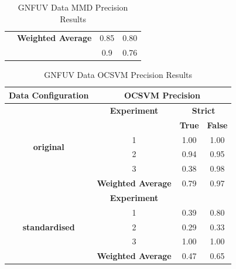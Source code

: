 \documentclass{mpaper}
\begin{document}
\begin{table}[]
\begin{tabular}{|c|ccc|}
                                                  & \multicolumn{1}{c|}{\textbf{Weighted Average}} & \multicolumn{1}{c|}{0.85}               & 0.80               \\
                                                  & \multicolumn{1}{c|}{}                          & \multicolumn{1}{c|}{0.9}                & 0.76               \\ \hline
\end{tabular}
\caption{\label{tab:gnfuv_mmd_precision}GNFUV Data MMD Precision Results}
\end{table}

\begin{table}[]
\centering
\begin{tabular}{|c|ccc|}
\hline
\textbf{Data Configuration}            & \multicolumn{3}{c|}{\textbf{OCSVM Precision}}                                         \\ \hline
\multirow{6}{*}{\textbf{original}}     & \multicolumn{1}{c|}{\textbf{Experiment}}       & \multicolumn{2}{c|}{\textbf{Strict}} \\ \cline{2-4} 
                                       & \multicolumn{1}{l|}{}                          & \textbf{True}    & \textbf{False}    \\ \cline{2-4} 
                                       & \multicolumn{1}{c|}{1}                         & 1.00             & 1.00              \\
                                       & \multicolumn{1}{c|}{2}                         & 0.94             & 0.95              \\
                                       & \multicolumn{1}{c|}{3}                         & 0.38             & 0.98              \\ \cline{2-4} 
                                       & \multicolumn{1}{c|}{\textbf{Weighted Average}} & 0.79             & 0.97              \\ \hline
\multirow{5}{*}{\textbf{standardised}} & \multicolumn{1}{c|}{\textbf{Experiment}}       &                  &                   \\ \cline{2-4} 
                                       & \multicolumn{1}{c|}{1}                         & 0.39             & 0.80              \\
                                       & \multicolumn{1}{c|}{2}                         & 0.29             & 0.33              \\
                                       & \multicolumn{1}{c|}{3}                         & 1.00             & 1.00              \\ \cline{2-4} 
                                       & \multicolumn{1}{c|}{\textbf{Weighted Average}} & 0.47             & 0.65              \\ \hline
\end{tabular}
\caption{\label{tab:gnfuv_ocsvm_precision} GNFUV Data OCSVM Precision Results}
\end{table}
\end{document}
